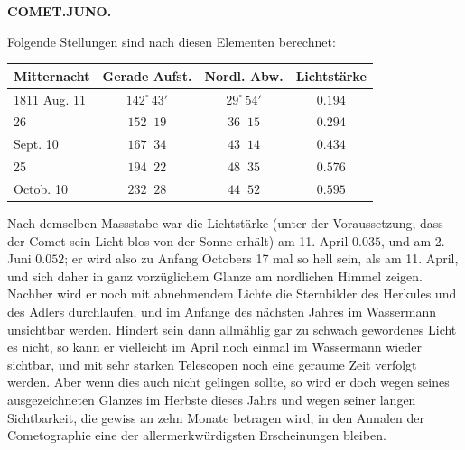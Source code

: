 \clearpage
\thispagestyle{empty}
\noindent{}%
%
\parbox[t]{\dimexpr\linewidth-24mm\relax}{\centering\footnotesize\bfseries COMET.\quad JUNO.\par}%
\makebox[12mm][r]{}\par\nobreak\medskip
\par\indent Folgende Stellungen sind nach diesen Elementen berechnet:
\begin{center}\fontsize{10}{12}\selectfont\setlength{\tabcolsep}{4pt}\renewcommand{\arraystretch}{1.15}
\begin{tabular}{l|cc|c}
Mitternacht & Gerade Aufst. & Nordl. Abw. & Lichtstärke \\
\hline
1811 Aug. 11 & $142^\circ\,43'$ & $29^\circ\,54'$ & $0.194$ \\
\phantom{1811 }\phantom{Aug. }26 & $152\;\;19$ & $36\;\;15$ & $0.294$ \\
Sept. 10 & $167\;\;34$ & $43\;\;14$ & $0.434$ \\
\phantom{Sept. }25 & $194\;\;22$ & $48\;\;35$ & $0.576$ \\
Octob. 10 & $232\;\;28$ & $44\;\;52$ & $0.595$ \\
\end{tabular}
\end{center}


\par\indent Nach demselben Massstabe war die Lichtstärke (unter der Voraussetzung, dass der Comet sein Licht blos von der Sonne erhält) am 11. April $0.035$, und am 2. Juni $0.052$; er wird also zu Anfang Octobers 17 mal so hell sein, als am 11. April, und sich daher in ganz vorzüglichem Glanze am nordlichen Himmel zeigen. Nachher wird er noch mit abnehmendem Lichte die Sternbilder des Herkules und des Adlers durchlaufen, und im Anfange des nächsten Jahres im Wassermann unsichtbar werden. Hindert sein dann allmählig gar zu schwach gewordenes Licht es nicht, so kann er vielleicht im April noch einmal im Wassermann wieder sichtbar, und mit sehr starken Telescopen noch eine geraume Zeit verfolgt werden. Aber wenn dies auch nicht gelingen sollte, so wird er doch wegen seines ausgezeichneten Glanzes im Herbste dieses Jahrs und wegen seiner langen Sichtbarkeit, die gewiss an zehn Monate betragen wird, in den Annalen der Cometographie eine der allermerkwürdigsten Erscheinungen bleiben.
